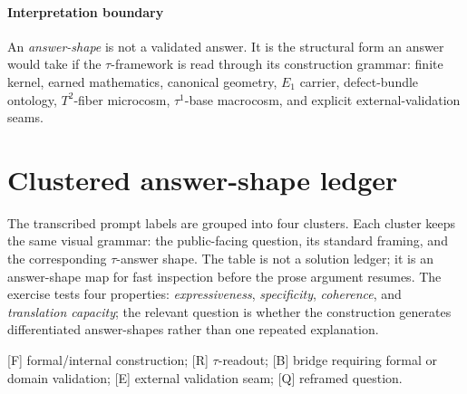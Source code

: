 \documentclass{pantarhei-researchnote}
\newcommand{\Ftag}{\textcolor{pr-brand-700}{\textsc{[F]}}}
\newcommand{\Rtag}{\textcolor{pr-lane-verify}{\textsc{[R]}}}
\newcommand{\Btag}{\textcolor{pr-lane-results}{\textsc{[B]}}}
\newcommand{\Etag}{\textcolor{pr-lane-publications}{\textsc{[E]}}}
\newcommand{\Qtag}{\textcolor{pr-lane-discover}{\textsc{[Q]}}}
\begin{document}
\paragraph*{Interpretation boundary}
An \emph{answer-shape} is not a validated answer. It is the structural form an
answer would take if the \(\tau\)-framework is read through its construction
grammar: finite kernel, earned mathematics, canonical geometry, \(E_1\)
carrier, defect-bundle ontology, \(T^2\)-fiber microcosm, \(\tau^1\)-base
macrocosm, and explicit external-validation seams.

\clearpage
\onecolumn

\section{Clustered answer-shape ledger}

The transcribed prompt labels are grouped into four clusters. Each cluster
keeps the same visual grammar: the public-facing question, its standard
framing, and the corresponding \(\tau\)-answer shape. The table is not a
solution ledger; it is an answer-shape map for fast inspection before the prose
argument resumes. The exercise tests four properties:
\emph{expressiveness}, \emph{specificity}, \emph{coherence}, and
\emph{translation capacity}; the relevant question is whether the construction
generates differentiated answer-shapes rather than one repeated explanation.

\smallskip
{}
\Ftag{} formal/internal construction; \Rtag{} \(\tau\)-readout;
\Btag{} bridge requiring formal or domain validation; \Etag{} external
validation seam; \Qtag{} reframed question.
\end{document}
